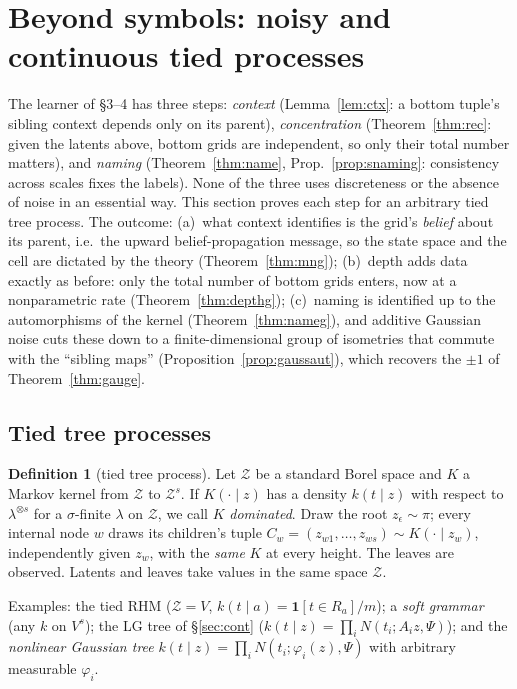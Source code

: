 \documentclass[11pt]{article}
\theoremstyle{definition}
\newtheorem{definition}[theorem]{Definition}
\begin{document}
\section{Beyond symbols: noisy and continuous tied processes}\label{sec:general}
The learner of \S3--4 has three steps: \emph{context} (Lemma~\ref{lem:ctx}: a bottom tuple's
sibling context depends only on its parent), \emph{concentration} (Theorem~\ref{thm:rec}: given
the latents above, bottom grids are independent, so only their total number matters), and
\emph{naming} (Theorem~\ref{thm:name}, Prop.~\ref{prop:snaming}: consistency across scales
fixes the labels). None of the three uses discreteness or the absence of noise in an essential
way. This section proves each step for an arbitrary tied tree process. The outcome:
(a)~what context identifies is the grid's \emph{belief} about its parent, i.e.\ the upward
belief-propagation message, so the state space and the cell are dictated by the theory
(Theorem~\ref{thm:mng});
(b)~depth adds data exactly as before: only the total number of bottom grids enters, now at a
nonparametric rate (Theorem~\ref{thm:depthg});
(c)~naming is identified up to the automorphisms of the kernel (Theorem~\ref{thm:nameg}), and
additive Gaussian noise cuts these down to a finite-dimensional group of isometries that commute
with the ``sibling maps'' (Proposition~\ref{prop:gaussaut}), which recovers the $\pm1$ of
Theorem~\ref{thm:gauge}.

\subsection{Tied tree processes}
\begin{definition}[tied tree process]\label{def:ttp}
Let $\mathcal Z$ be a standard Borel space and $K$ a Markov kernel from $\mathcal Z$ to
$\mathcal Z^s$. If $K(\cdot\mid z)$ has a density $k(t\mid z)$ with respect to $\lambda^{\otimes s}$
for a $\sigma$-finite $\lambda$ on $\mathcal Z$, we call $K$ \emph{dominated}. Draw the root $z_\epsilon\sim\pi$; every internal node $w$ draws its
children's tuple $C_w=(z_{w1},\dots,z_{ws})\sim K(\cdot\mid z_w)$, independently given $z_w$,
with the \emph{same} $K$ at every height. The leaves are observed. Latents and leaves take
values in the same space $\mathcal Z$.
\end{definition}
\noindent Examples: the tied RHM ($\mathcal Z=V$, $k(t\mid a)=\mathbf 1[t\in R_a]/m$); a
\emph{soft grammar} (any $k$ on $V^s$); the LG tree of \S\ref{sec:cont}
($k(t\mid z)=\prod_iN(t_i;A_iz,\Psi)$); and the \emph{nonlinear Gaussian tree}
$k(t\mid z)=\prod_iN(t_i;\varphi_i(z),\Psi)$ with arbitrary measurable $\varphi_i$.
\end{document}
